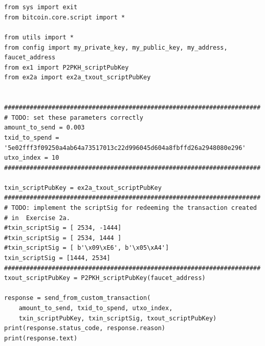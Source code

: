 \documentclass[letterpaper]{article}
\begin{document}
\section{}
\begin{verbatim}
from sys import exit
from bitcoin.core.script import *

from utils import *
from config import my_private_key, my_public_key, my_address, faucet_address
from ex1 import P2PKH_scriptPubKey
from ex2a import ex2a_txout_scriptPubKey


######################################################################
# TODO: set these parameters correctly
amount_to_send = 0.003
txid_to_spend = '5e02fff3f09250a4ab64a73517013c22d996045d604a8fbffd26a2948080e296'
utxo_index = 10
######################################################################

txin_scriptPubKey = ex2a_txout_scriptPubKey
######################################################################
# TODO: implement the scriptSig for redeeming the transaction created
# in  Exercise 2a.
#txin_scriptSig = [ 2534, -1444]
#txin_scriptSig = [ 2534, 1444 ]
#txin_scriptSig = [ b'\x09\xE6', b'\x05\xA4']
txin_scriptSig = [1444, 2534]
######################################################################
txout_scriptPubKey = P2PKH_scriptPubKey(faucet_address)

response = send_from_custom_transaction(
    amount_to_send, txid_to_spend, utxo_index,
    txin_scriptPubKey, txin_scriptSig, txout_scriptPubKey)
print(response.status_code, response.reason)
print(response.text)

\end{verbatim}
\end{document}
